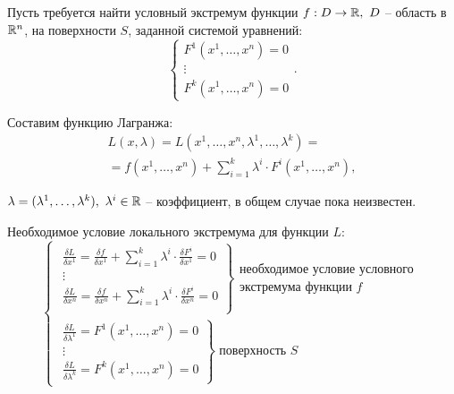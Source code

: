 \begin{task}
    Пусть требуется найти условный экстремум функции $f:D\rightarrow\mathbb{R}, \ D$ -- область в $\mathbb{R}^n$, на поверхности $S$, заданной системой уравнений:
    \[
        \left\{\begin{array}{l}
            F^1(x^1,\ldots,x^n) = 0 \\
            \vdots                  \\
            F^k(x^1,\ldots,x^n) = 0
        \end{array}\right..
    \]

    Составим функцию Лагранжа:
    \begin{multline*}
        L(x,\lambda) = L(x^1,\ldots,x^n,\lambda^1,\ldots,\lambda^k) = \\
        = f(x^1,\ldots,x^n) + \sum_{i=1}^{k}\lambda^i\cdot F^i(x^1,\ldots,x^n),
    \end{multline*}

    $\lambda = (\lambda^1,\ldots,\lambda^k), \ \lambda^i \in \R$ -- коэффициент, в общем случае пока неизвестен.

    Необходимое условие локального экстремума для функции $L:$
    \begin{equation}\label{eq:24}
        \left\{\begin{array}{l}
            \left.\begin{array}{l}
                      \frac{\delta L}{\delta x^1} = \frac{\delta f}{\delta x^1} + \sum_{i = 1}^{k}\lambda^i\cdot\frac{\delta F^i}{\delta x^1} = 0 \\
                      \vdots                                                                                                                      \\
                      \frac{\delta L}{\delta x^n} = \frac{\delta f}{\delta x^n} + \sum_{i = 1}^{k}\lambda^i\cdot\frac{\delta F^i}{\delta x^n} = 0 \\
                  \end{array}\right\}\begin{array}{l}
                                         \text{необходимое условие условного} \\
                                         \text{экстремума функции }f
                                     \end{array} \\
            \left.\begin{array}{l}
                      \frac{\delta L}{\delta \lambda^1} = F^1(x^1,\ldots,x^n) = 0 \\
                      \vdots                                                      \\
                      \frac{\delta L}{\delta \lambda^k} = F^k(x^1,\ldots,x^n) = 0
                  \end{array}\right\}\text{ поверхность }S
        \end{array}\right.
    \end{equation}
\end{task}

